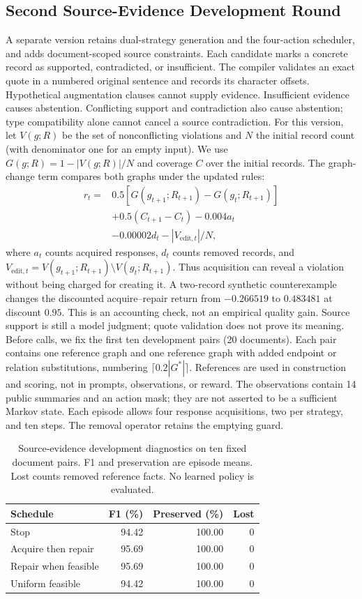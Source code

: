 \subsection{Second Source-Evidence Development Round}
\label{app:docred_v2_round2}
A separate version retains dual-strategy generation and the four-action scheduler, and adds document-scoped source constraints. Each candidate marks a concrete record as supported, contradicted, or insufficient. The compiler validates an exact quote in a numbered original sentence and records its character offsets. Hypothetical augmentation clauses cannot supply evidence. Insufficient evidence causes abstention. Conflicting support and contradiction also cause abstention; type compatibility alone cannot cancel a source contradiction.
For this version, let $V(g;R)$ be the set of nonconflicting violations and $N$ the initial record count (with denominator one for an empty input). We use $G(g;R)=1-|V(g;R)|/N$ and coverage $C$ over the initial records. The graph-change term compares both graphs under the updated rules:
\begin{align}
r_t={}&0.5\left[G(g_{t+1};R_{t+1})-G(g_t;R_{t+1})\right] \nonumber\\
&+0.5(C_{t+1}-C_t)-0.004a_t \nonumber\\
&-0.00002d_t-|V_{\mathrm{edit},t}|/N,
\end{align}
where $a_t$ counts acquired responses, $d_t$ counts removed records, and $V_{\mathrm{edit},t}=V(g_{t+1};R_{t+1})\setminus V(g_t;R_{t+1})$. Thus acquisition can reveal a violation without being charged for creating it. A two-record synthetic counterexample changes the discounted acquire--repair return from $-0.266519$ to $0.483481$ at discount $0.95$. This is an accounting check, not an empirical quality gain. Source support is still a model judgment; quote validation does not prove its meaning.
Before calls, we fix the first ten development pairs (20 documents). Each pair contains one reference graph and one reference graph with added endpoint or relation substitutions, numbering $\lceil0.2|G^*|\rceil$. References are used in construction and scoring, not in prompts, observations, or reward. The observations contain 14 public summaries and an action mask; they are not asserted to be a sufficient Markov state. Each episode allows four response acquisitions, two per strategy, and ten steps. The removal operator retains the emptying guard.
\begin{table}[t]
\centering
\caption{Source-evidence development diagnostics on ten fixed document pairs. F1 and preservation are episode means. Lost counts removed reference facts. No learned policy is evaluated.}
\label{tab:docred_source_pilot_round2}
\small
\begin{tabular}{lrrr}
\hline
Schedule & F1 (\%) & Preserved (\%) & Lost \\
\hline
Stop & 94.42 & 100.00 & 0 \\
Acquire then repair & 95.69 & 100.00 & 0 \\
Repair when feasible & 95.69 & 100.00 & 0 \\
Uniform feasible & 94.42 & 100.00 & 0 \\
\hline
\end{tabular}
\end{table}
